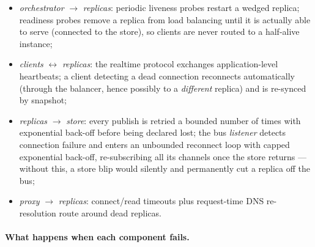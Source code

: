 \documentclass{scrartcl}
\begin{document}
\begin{itemize}
  \item \emph{orchestrator} $\to$ \emph{replicas}: periodic liveness
  probes restart a wedged replica; readiness probes remove a replica from
  load balancing until it is actually able to serve (connected to the
  store), so clients are never routed to a half-alive instance;
  \item \emph{clients} $\leftrightarrow$ \emph{replicas}: the realtime
  protocol exchanges application-level heartbeats; a client detecting a
  dead connection reconnects automatically (through the balancer, hence
  possibly to a \emph{different} replica) and is re-synced by snapshot;
  \item \emph{replicas} $\to$ \emph{store}: every publish is retried a
  bounded number of times with exponential back-off before being declared
  lost; the bus \emph{listener} detects connection failure and enters an
  unbounded reconnect loop with capped exponential back-off,
  re-subscribing all its channels once the store returns --- without this,
  a store blip would silently and permanently cut a replica off the bus;
  \item \emph{proxy} $\to$ \emph{replicas}: connect/read timeouts plus
  request-time DNS re-resolution route around dead replicas.
\end{itemize}

\paragraph{What happens when each component fails.}
\end{document}
